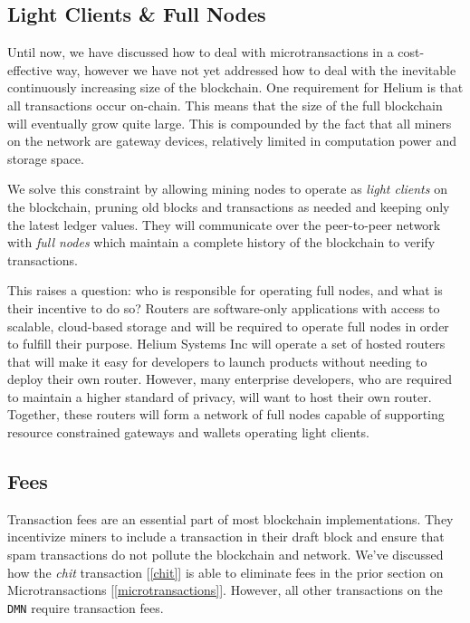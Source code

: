 \documentclass[UTF8, 10pt, nonatbib, nocopyrightspace, reprint]{sigplanconf}
\newcommand{\secref}[1]{[\autoref{#1}]}
\begin{document}
\subsection{Light Clients \& Full Nodes} \label{full-nodes}

Until now, we have discussed how to deal with microtransactions in a cost-effective way, however we have not yet addressed how to deal with the inevitable continuously increasing size of the blockchain. One requirement for Helium is that all transactions occur on-chain. This means that the size of the full blockchain will eventually grow quite large. This is compounded by the fact that all miners on the network are gateway devices, relatively limited in computation power and storage space.

We solve this constraint by allowing mining nodes to operate as \emph{light clients} on the blockchain, pruning old blocks and transactions as needed and keeping only the latest ledger values. They will communicate over the peer-to-peer network with \emph{full nodes} which maintain a complete history of the blockchain to verify transactions.

This raises a question: who is responsible for operating full nodes, and what is their incentive to do so? Routers are software-only applications with access to scalable, cloud-based storage and will be required to operate full nodes in order to fulfill their purpose. Helium Systems Inc will operate a set of hosted routers that will make it easy for developers to launch products without needing to deploy their own router. However, many enterprise developers, who are required to maintain a higher standard of privacy, will want to host their own router. Together, these routers will form a network of full nodes capable of supporting resource constrained gateways and wallets operating light clients.

\subsection{Fees} \label{fees}

Transaction fees are an essential part of most blockchain implementations. They incentivize miners to include a transaction in their draft block and ensure that spam transactions do not pollute the blockchain and network. We've discussed how the \emph{chit} transaction \secref{chit} is able to eliminate fees in the prior section on Microtransactions \secref{microtransactions}. However, all other transactions on the \verb|DMN| require transaction fees.
\end{document}
